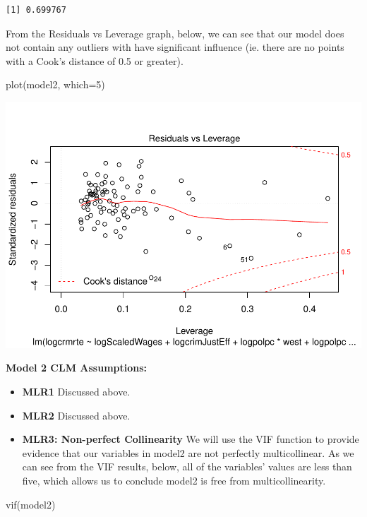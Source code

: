 \documentclass[]{article}
\newenvironment{Shaded}{}{}
\newcommand{\DataTypeTok}[1]{#1}
\newcommand{\DecValTok}[1]{#1}
\newcommand{\KeywordTok}[1]{\textcolor[rgb]{0.00,0.00,1.00}{#1}}
\newcommand{\NormalTok}[1]{#1}
\begin{document}
\begin{verbatim}
[1] 0.699767
\end{verbatim}

From the Residuals vs Leverage graph, below, we can see that our model
does not contain any outliers with have significant influence (ie. there
are no points with a Cook's distance of 0.5 or greater).

\begin{Shaded}
\begin{Highlighting}[]
\KeywordTok{plot}\NormalTok{(model2, }\DataTypeTok{which=}\DecValTok{5}\NormalTok{)}
\end{Highlighting}
\end{Shaded}

\includegraphics{Bagnard_Gaustad_Hartman_Leung_Lab_3_files/figure-latex/unnamed-chunk-70-1.pdf}

\textbf{Model 2 CLM Assumptions:}

\begin{itemize}
\item
  \textbf{MLR1} Discussed above.
\item
  \textbf{MLR2} Discussed above.
\item
  \textbf{MLR3: Non-perfect Collinearity} We will use the VIF function
  to provide evidence that our variables in model2 are not perfectly
  multicollinear. As we can see from the VIF results, below, all of the
  variables' values are less than five, which allows us to conclude
  model2 is free from multicollinearity.
\end{itemize}

\begin{Shaded}
\begin{Highlighting}[]
\KeywordTok{vif}\NormalTok{(model2)}
\end{Highlighting}
\end{Shaded}
\end{document}
